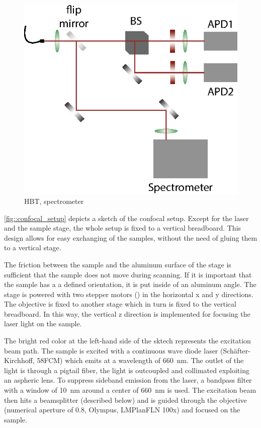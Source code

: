 	\begin{figure}[t] %
		\centering
		\includegraphics[width=\linewidth]{./pics/hbt_spectrometer.eps}
		\caption{HBT, spectrometer}
		\label{fig::hbt_spectrometer}
	\end{figure}

	\autoref{fig::confocal_setup} depicts a sketch of the confocal setup. 
	Except for the laser and the sample stage, the whole setup is fixed to a vertical breadboard. 
	This design allows for easy exchanging of the samples, without the need of gluing them to a vertical stage.

	The friction between the sample and the aluminum surface of the stage is sufficient that the sample does not move during scanning.
	If it is important that the sample has a a defined orientation, it is put inside of an aluminum angle.
	The stage is powered with two stepper motors () in the horizontal x and y directions.
	The objective is fixed to another stage which in turn is fixed to the vertical breadboard.
	In this way, the vertical z direction is implemented for focusing the laser light on the sample.

	The bright red color at the left-hand side of the sktech represents the excitation beam path.
	The sample is excited with a continuous wave diode laser (Sch\"after-Kirchhoff, 58FCM) which emits at a wavelength of \SI{660}{\nano\meter}.
	The outlet of the light is through a pigtail fiber, the light is outcoupled and collimated exploiting an aspheric lens.
	To suppress sideband emission from the laser, a bandpass filter with a window of  \SI{10}{\nm} around a center of \SI{660}{\nm} is used.
	The excitation beam then hits a beamsplitter (described below) and is guided through the objective (numerical aperture of 0.8, Olympus, LMPlanFLN 100x) and focused on the sample.

